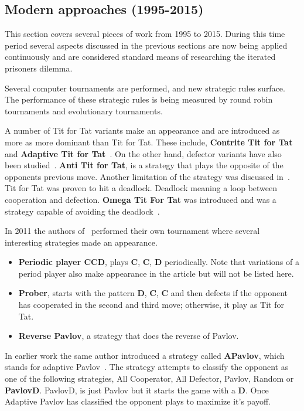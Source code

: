 \documentclass{article}
\begin{document}
\subsection{Modern approaches (1995-2015)}\label{section:modern_approaches}

This section covers several pieces of work from 1995 to 2015. During this time
period several aspects discussed in the previous sections are now being applied
continuously and are considered standard means of researching the iterated
prisoners dilemma.

Several computer tournaments are performed, and new strategic rules surface.
The performance of these strategic rules is being measured by round robin tournaments
and evolutionary tournaments.
 
A number of Tit for Tat variants make an appearance and are introduced as more
as more dominant than Tit for Tat. These include, \textbf{Contrite Tit for Tat}
\cite{Wu1995} and \textbf{Adaptive Tit for Tat}~\cite{tzafestas-2000a}.
On the other hand, defector variants have also been studied~\cite{Hilde2013}.
\textbf{Anti Tit for Tat}, is a strategy that plays the opposite of the opponents
previous move. Another limitation of the strategy was discussed in~\cite{Wolfgang2006}.
Tit for Tat was proven to hit a deadlock. Deadlock meaning a loop between 
cooperation and defection. \textbf{Omega Tit For Tat} was introduced and was
a strategy capable of avoiding the deadlock~\cite{Wolfgang2006}.

In 2011 the authors of~\cite{Li2011} performed their own tournament where 
several interesting strategies made an appearance.

\begin{itemize}
    \item \textbf{Periodic player CCD}, plays \textbf{C}, \textbf{C}, \textbf{D} 
    periodically. Note that variations of a period player also make appearance
    in the article but will not be listed here.
    \item \textbf{Prober}, starts with the pattern \textbf{D}, \textbf{C}, \textbf{C}
     and then defects if the opponent has cooperated in the second and third move;
     otherwise, it play as Tit for Tat.
    \item \textbf{Reverse Pavlov}, a strategy that does the reverse of Pavlov.
\end{itemize}

In earlier work the same author introduced a strategy called \textbf{APavlov},
which stands for adaptive Pavlov~\cite{Li2007}. The strategy attempts to 
classify the opponent as one of the following strategies, All Cooperator, 
All Defector, Pavlov, Random or \textbf{PavlovD}. PavlovD, is just Pavlov
but it starts the game with a \textbf{D}. Once Adaptive Pavlov has classified
the opponent plays to maximize it's payoff.
\end{document}
